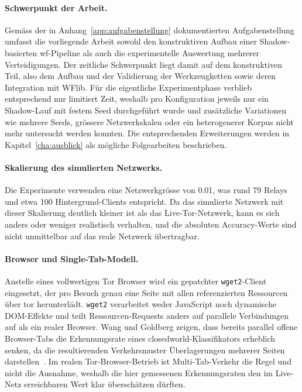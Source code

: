 \paragraph{Schwerpunkt der Arbeit.}
Gemäss der in Anhang~\ref{app:aufgabenstellung} dokumentierten Aufgabenstellung umfasst die vorliegende Arbeit sowohl den konstruktiven Aufbau einer Shadow-basierten \gls{wf}-Pipeline als auch die experimentelle Auswertung mehrerer Verteidigungen.
Der zeitliche Schwerpunkt liegt damit auf dem konstruktiven Teil, also dem Aufbau und der Validierung der Werkzeugketten sowie deren Integration mit WFlib.
Für die eigentliche Experimentphase verblieb entsprechend nur limitiert Zeit, weshalb pro Konfiguration jeweils nur ein Shadow-Lauf mit festem Seed durchgeführt wurde und zusätzliche Variationen wie mehrere Seeds, grössere Netzwerkskalen oder ein heterogenerer Korpus nicht mehr untersucht werden konnten.
Die entsprechenden Erweiterungen werden in Kapitel~\ref{cha:ausblick} als mögliche Folgearbeiten beschrieben.

\paragraph{Skalierung des simulierten Netzwerks.}
Die Experimente verwenden eine Netzwerkgrösse von 0.01, was rund 79 Relays und etwa 100 Hintergrund-Clients entspricht.
Da das simulierte Netzwerk mit dieser Skalierung deutlich kleiner ist als das Live-Tor-Netzwerk, kann es sich anders oder weniger realistisch verhalten, und die absoluten Accuracy-Werte sind nicht unmittelbar auf das reale Netzwerk übertragbar.

\paragraph{Browser und Single-Tab-Modell.}
Anstelle eines vollwertigen Tor Browser wird ein gepatchter \texttt{wget2}-Client eingesetzt, der pro Besuch genau eine Seite mit allen referenzierten Ressourcen über \gls{tor} herunterlädt.
\texttt{wget2} verarbeitet weder JavaScript noch dynamische DOM-Effekte und teilt Ressourcen-Requests anders auf parallele Verbindungen auf als ein realer Browser.
Wang und Goldberg zeigen, dass bereits parallel offene Browser-Tabs die Erkennungsrate eines \gls{closedworld}-Klassifikators erheblich senken, da die resultierenden Verkehrsmuster Überlagerungen mehrerer Seiten darstellen~\cite{wang2016realistically}.
Im realen Tor-Browser-Betrieb ist Multi-Tab-Verkehr die Regel und nicht die Ausnahme, weshalb die hier gemessenen Erkennungsraten den im Live-Netz erreichbaren Wert klar überschätzen dürften.

